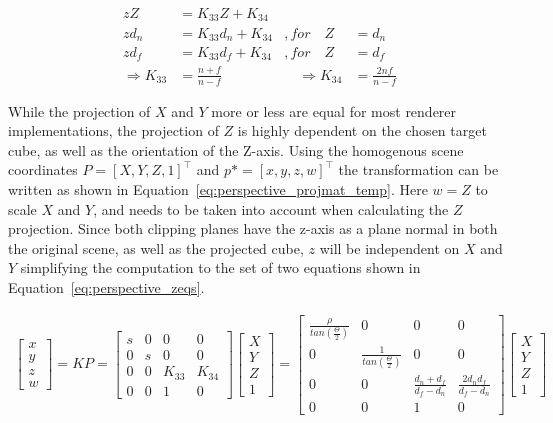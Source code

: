 \begin{equation}
    \begin{aligned}
        zZ &= K_{33} Z + K_{34} &\\
        zd_n &= K_{33} d_n + K_{34} &, for \quad Z &= d_n \\
        zd_f &= K_{33} d_f + K_{34} &, for \quad Z &= d_f \\
        \Rightarrow K_{33} &= \frac{n+f}{n-f} & \quad \Rightarrow K_{34} &= \frac{2nf}{n-f}
    \end{aligned}
    \label{eq:perspective_zeqs}
\end{equation}


While the projection of $X$ and $Y$ more or less are equal for most renderer implementations, the projection of $Z$ is highly dependent on the chosen target cube, as well as the orientation of the Z-axis. Using the homogenous scene coordinates $P = [X,Y,Z,1]^\top$ and $p* = [x,y,z,w]^\top$ the transformation can be written as shown in Equation~\eqref{eq:perspective_projmat_temp}. Here $w = Z$ to scale $X$ and $Y$, and needs to be taken into account when calculating the $Z$ projection. Since both clipping planes have the z-axis as a plane normal in both the original scene, as well as the projected cube, $z$ will be independent on $X$ and $Y$ simplifying the computation to the set of two equations shown in Equation~\eqref{eq:perspective_zeqs}.


\begin{align}
    \begin{bmatrix}
        x \\ y \\ z \\ w
    \end{bmatrix} = KP = \begin{bmatrix}
        s & 0 & 0 & 0 \\
        0 & s & 0 & 0 \\
        0 & 0 & K_{33} & K_{34} \\
        0 & 0 & 1 & 0
    \end{bmatrix} \begin{bmatrix}
        X \\ Y \\ Z \\ 1
    \end{bmatrix} = \begin{bmatrix}
        \frac{\rho}{tan\left(\frac{\Theta}{2}\right)}& 0 & 0 & 0 \\
        0 & \frac{1}{tan\left(\frac{\Theta}{2}\right)}& 0 & 0 \\
        0 & 0 & \frac{d_n+d_f}{d_f-d_n} & \frac{2d_n d_f}{d_f-d_n} \\
        0 & 0 & 1 & 0
    \end{bmatrix} \begin{bmatrix}
        X \\ Y \\ Z \\ 1
    \end{bmatrix}
    \label{eq:perspective_projmat_temp}
\end{align}

